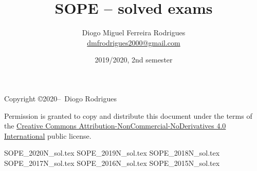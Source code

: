\documentclass{sope}
\title{SOPE -- solved exams}
\author{Diogo Miguel Ferreira Rodrigues \\ \href{mailto:dmfrodrigues2000@gmail.com}{dmfrodrigues2000@gmail.com}}
\date{2019/2020, 2nd semester}
\begin{document}
\frontmatter
\maketitle
\begin{secondpage}
    Copyright \copyright 2020--\the\year\ Diogo Rodrigues\par
    \par
    Permission is granted to copy and distribute this document under the terms of the
    \href{https://creativecommons.org/licenses/by-nc-nd/4.0/}{Creative Commons Attribution-NonCommercial-NoDerivatives 4.0 International}
    public license.
\end{secondpage}
\setcounter{tocdepth}{2}
\tableofcontents
\mainmatter
{SOPE_2020N_sol.tex}
{SOPE_2019N_sol.tex}
{SOPE_2018N_sol.tex}
{SOPE_2017N_sol.tex}
{SOPE_2016N_sol.tex}
{SOPE_2015N_sol.tex}
\end{document}
